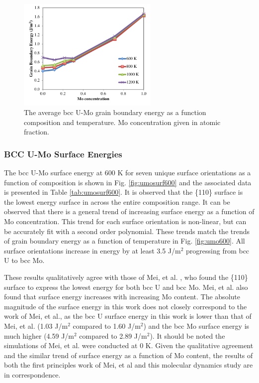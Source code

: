 \documentclass[review]{elsarticle}
\begin{document}
\begin{figure}[h]
 \centering
 \includegraphics[width=0.6\textwidth]{avg_vs_mo.png} 
 \caption{The average bcc U-Mo grain boundary energy as a function composition and temperature. Mo concentration given in atomic fraction.}
 \label{fig:avgvsmo}
\end{figure}

\FloatBarrier

 
\subsubsection{BCC U-Mo Surface Energies}

The bcc U-Mo surface energy at 600 K for seven unique surface orientations as a function of composition is shown in Fig. \ref{fig:umosurf600} and the associated data is presented in Table \ref{tab:umosurf600}. It is observed that the \{110\} surface is the lowest energy surface in across the entire composition range. It can be observed that there is a general trend of increasing surface energy as a function of Mo concentration. This trend for each surface orientation is non-linear, but can be accurately fit with a second order polynomial. These trends match the trends of grain boundary energy as a function of temperature in Fig. \ref{fig:umo600}. All surface orientations increase in energy by at least 3.5 J/m$^{2}$ progressing from bcc U to bcc Mo. 

These results qualitatively agree with those of Mei, et al. \cite{zhigang2018}, who found the \{110\} surface to express the lowest energy for both bcc U and bcc Mo. Mei, et al. also found that surface energy increases with increasing Mo content. The absolute magnitude of the surface energy in this work does not closely correspond to the work of Mei, et al., as the bcc U surface energy in this work is lower than that of Mei, et al. (1.03 J/m$^{2}$ compared to 1.60 J/m$^{2}$) and the bcc Mo surface energy is much higher (4.59 J/m$^{2}$ compared to 2.89 J/m$^{2}$). It should be noted the simulations of Mei, et al. were conducted at 0 K. Given the qualitative agreement and the similar trend of surface energy as a function of Mo content, the results of both the first principles work of Mei, et al \cite{zhigang2018} and this molecular dynamics study are in correspondence.
\end{document}
